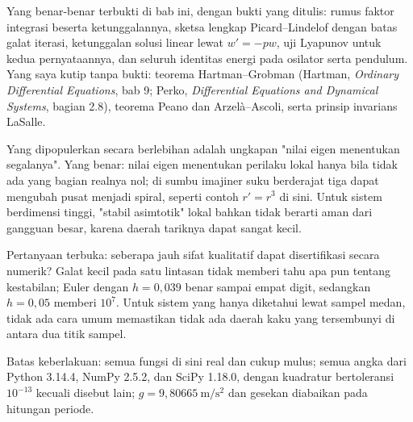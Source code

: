 \begin{untukpeneliti}
Yang benar-benar terbukti di bab ini, dengan bukti yang ditulis: rumus faktor
integrasi beserta ketunggalannya, sketsa lengkap Picard--Lindelof dengan
batas galat iterasi, ketunggalan solusi linear lewat $w'=-pw$, uji Lyapunov
untuk kedua pernyataannya, dan seluruh identitas energi pada osilator serta
pendulum. Yang saya kutip tanpa bukti: teorema Hartman--Grobman (Hartman,
\emph{Ordinary Differential Equations}, bab 9; Perko, \emph{Differential
Equations and Dynamical Systems}, bagian 2.8), teorema Peano dan
Arzel\`a--Ascoli, serta prinsip invarians LaSalle. 

Yang dipopulerkan secara berlebihan adalah ungkapan "nilai eigen menentukan
segalanya". Yang benar: nilai eigen menentukan perilaku lokal hanya bila tidak
ada yang bagian realnya nol; di sumbu imajiner suku berderajat tiga dapat
mengubah pusat menjadi spiral, seperti contoh $r'=r^{3}$ di sini. Untuk sistem
berdimensi tinggi, "stabil asimtotik" lokal bahkan tidak berarti aman dari
gangguan besar, karena daerah tariknya dapat sangat kecil.

Pertanyaan terbuka: seberapa jauh sifat kualitatif dapat disertifikasi secara
numerik? Galat kecil pada satu lintasan tidak memberi tahu apa pun tentang
kestabilan; Euler dengan $h=0{,}039$ benar sampai empat digit, sedangkan $h=0{,}05$
memberi $10^{7}$. Untuk sistem yang hanya diketahui lewat sampel medan, tidak ada
cara umum memastikan tidak ada daerah kaku yang tersembunyi di antara dua titik
sampel.

Batas keberlakuan: semua fungsi di sini real dan cukup mulus; semua angka dari
Python 3.14.4, NumPy 2.5.2, dan SciPy 1.18.0, dengan kuadratur bertoleransi
$10^{-13}$ kecuali disebut lain; $g=9{,}80665\ \mathrm{m/s^{2}}$ dan gesekan
diabaikan pada hitungan periode.
\end{untukpeneliti}

